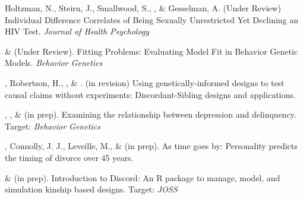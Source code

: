 

\item Holtzman, N., Steirn, J., Smallwood, S., \meb, \& Gesselman, A. (Under Review) Individual Difference Correlates of Being Sexually Unrestricted Yet Declining an HIV Test. \textit{Journal of Health Psychology}

\item \meb \& \joe (Under Review). Fitting Problems: Evaluating Model Fit in Behavior Genetic Models. \textit{Behavior Genetics}


\item \meb, Robertson, H.\noteA, \jt, \& \joe. (in revision) Using genetically-informed designs to test causal claims without experiments: Discordant-Sibling designs and applications. \href{https://osf.io/zpdwt/}{\small\color{blue}{osf.io/zpdwt/}}%



\item \emsims, \jt, \& \meb (in prep). Examining the relationship between depression and delinquency. Target: \textit{Behavior Genetics}

\item \meb, Connolly, J. J., Leveille, M., \& \jjj (in prep). As time goes by: Personality predicts the timing of divorce over 45 years.%
%


\item \jt \& \meb (in prep). Introduction to Discord: An R package to manage, model, and simulation kinship based designs. Target: \textit{JOSS}







